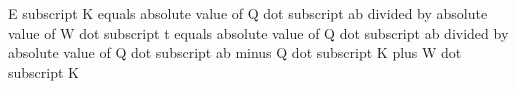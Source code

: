 E subscript K equals absolute value of Q dot subscript ab divided by absolute value of W dot subscript t equals absolute value of Q dot subscript ab divided by absolute value of Q dot subscript ab minus Q dot subscript K plus W dot subscript K